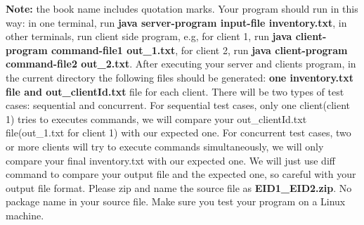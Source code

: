 \documentclass[letter, 11pt] {article}
\begin{document}
\begin{enumerate}
  
  
\textbf{Note:} the book name includes quotation marks. Your program should run in this way: in one terminal, run \textbf{java server-program input-file inventory.txt}, in other terminals, run client side program, e.g, for client 1, run \textbf{java client-program command-file1 out\_1.txt}, for client 2, run \textbf{java client-program command-file2 out\_2.txt}. After executing your server and clients program, in the current directory the following files should be generated: \textbf{one inventory.txt file and out\_clientId.txt} file for each client. There will be two types of test cases: sequential and concurrent. For sequential test cases, only one client(client 1) tries to executes commands, we will compare your out\_clientId.txt file(out\_1.txt for client 1) with our expected one. For concurrent test cases, two or more clients will try to execute commands simultaneously, we will only compare your final inventory.txt with our expected one. We will just use diff command to compare your output file and the expected one, so careful with your output file format. Please zip and name the source file as \textbf{EID1\_EID2.zip}. No package name in your source file. Make sure you test your program on a Linux machine. 

\end{enumerate}
\end{document}
